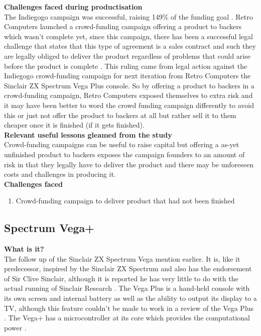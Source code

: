 \textbf{Challenges faced during productisation}\\
The Indiegogo campaign was successful, raising 149\% of the funding goal 
\cite{RN119}. 
Retro Computers launched a crowd-funding campaign offering a product to backers which wasn't complete yet, since this campaign, there has been a successful legal challenge that states that this type of agreement is a sales contract and such they are legally obliged to deliver the product regardless of problems that could arise before the product is complete 
\cite{RN122}. This ruling came from legal action against the Indiegogo crowd-funding campaign for next iteration from Retro Computers the Sinclair ZX Spectrum Vega Plus console. So by offering a product to backers in a crowd-funding campaign, Retro Computers exposed themselves to extra risk and it may have been better to word the crowd funding campaign differently to avoid this or just not offer the product to backers at all but rather sell it to them cheaper once it is finished (if it gets finished).\\

\textbf{Relevant useful lessons gleamed from the study}\\
Crowd-funding campaigns can be useful to raise capital but offering a as-yet unfinished product to backers exposes the campaign founders to an amount of risk in that they legally have to deliver the product and there may be unforeseen costs and challenges in producing it.\\

\textbf{Challenges faced}
\begin{enumerate}
\item Crowd-funding campaign to deliver product that had not been finished
\end{enumerate}

\subsection{Spectrum Vega+}
\textbf{What is it?}\\
The follow up of the Sinclair ZX Spectrum Vega mention earlier. It is, like it predecessor, inspired by the Sinclair ZX Spectrum and also has the endorsement of Sir Clive Sinclair, although it is reported he has very little to do with the actual running of Sinclair Research 
\cite{RN123}. The Vega Plus is a hand-held console with its own screen and internal battery as well as the ability to output its display to a TV, although this feature couldn't be made to work in a review of the Vega Plus 
\cite{RN117}. The Vega+ has a microcontroller at its core which provides the computational power 
\cite{RN143}.\\

